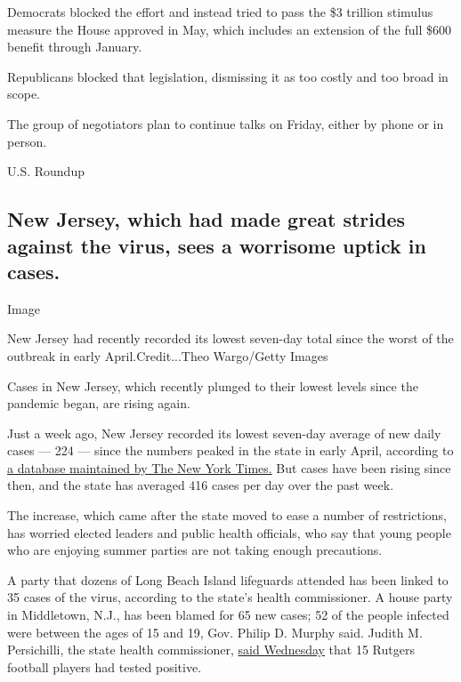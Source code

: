 Democrats blocked the effort and instead tried to pass the \$3 trillion
stimulus measure the House approved in May, which includes an extension
of the full \$600 benefit through January.

Republicans blocked that legislation, dismissing it as too costly and
too broad in scope.

The group of negotiators plan to continue talks on Friday, either by
phone or in person.

U.S. Roundup

\hypertarget{new-jersey-which-had-made-great-strides-against-the-virus-sees-a-worrisome-uptick-in-cases}{%
\subsection{New Jersey, which had made great strides against the virus,
sees a worrisome uptick in
cases.}\label{new-jersey-which-had-made-great-strides-against-the-virus-sees-a-worrisome-uptick-in-cases}}

Image

New Jersey had recently recorded its lowest seven-day total since the
worst of the outbreak in early April.Credit...Theo Wargo/Getty Images

Cases in New Jersey, which recently plunged to their lowest levels since
the pandemic began, are rising again.

Just a week ago, New Jersey recorded its lowest seven-day average of new
daily cases --- 224 --- since the numbers peaked in the state in early
April, according to
\href{https://www.nytimes.com/interactive/2020/us/new-jersey-coronavirus-cases.html}{a
database maintained by The New York Times.} But cases have been rising
since then, and the state has averaged 416 cases per day over the past
week.

The increase, which came after the state moved to ease a number of
restrictions, has worried elected leaders and public health officials,
who say that young people who are enjoying summer parties are not taking
enough precautions.

A party that dozens of Long Beach Island lifeguards attended has been
linked to 35 cases of the virus, according to the state's health
commissioner. A house party in Middletown, N.J., has been blamed for 65
new cases; 52 of the people infected were between the ages of 15 and 19,
Gov. Philip D. Murphy said. Judith M. Persichilli, the state health
commissioner, \href{https://www.youtube.com/watch?v=oqLsxnOmEAc}{said
Wednesday} that 15 Rutgers football players had tested positive.

